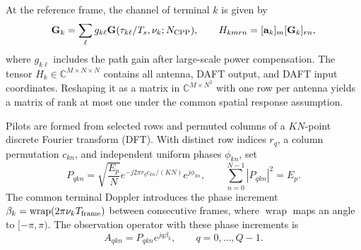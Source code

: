 At the reference frame, the channel of terminal $k$ is given by
\begin{equation}
 \mathbf G_k=\sum_\ell g_{k\ell}
 \mathbf G(\tau_{k\ell}/T_s,\nu_k;N_{\rm CPP}),
 \qquad
 H_{kmrn}=[\mathbf a_k]_m[\mathbf G_k]_{rn},
 \label{eq:channel}
\end{equation}
where $g_{k\ell}$ includes the path gain after large-scale power
compensation. The tensor $H_k\in\mathbb C^{M\times N\times N}$ contains
all antenna, DAFT output, and DAFT input coordinates. Reshaping it as a matrix
in $\mathbb C^{M\times N^2}$ with one row per antenna yields a matrix of rank at most one under
the common spatial response assumption.

Pilots are formed from selected rows and permuted columns of a
$KN$-point discrete Fourier transform (DFT). With distinct row indices
$r_q$, a column permutation $c_{kn}$, and independent uniform phases
$\phi_{kn}$, set
\begin{equation}
 P_{qkn}=\sqrt{\frac{E_p}{N}}
 e^{-j2\pi r_qc_{kn}/(KN)}e^{j\phi_{kn}},
 \qquad \sum_{n=0}^{N-1}|P_{qkn}|^2=E_p.
 \label{eq:pilot}
\end{equation}
The common terminal Doppler introduces the phase increment
$\beta_k=\operatorname{wrap}(2\pi\nu_kT_{\rm frame})$ between consecutive
frames, where $\operatorname{wrap}$ maps an angle to $[-\pi,\pi)$.
The observation operator with these phase increments is
\begin{equation}
 A_{qkn}=P_{qkn}e^{jq\beta_k},\qquad q=0,\ldots,Q-1.
 \label{eq:effective-pilot}
\end{equation}

